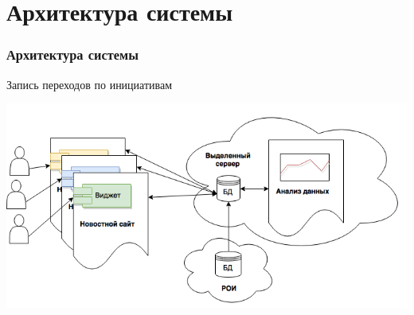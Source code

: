 \documentclass{beamer}
\begin{document}
\section{Архитектура системы}
\begin{frame}
\frametitle{Архитектура системы}
Запись переходов по инициативам

\vspace{0.5cm}
\includegraphics[width=1\textwidth]{images/arch2}
\end{frame}
\end{document}

